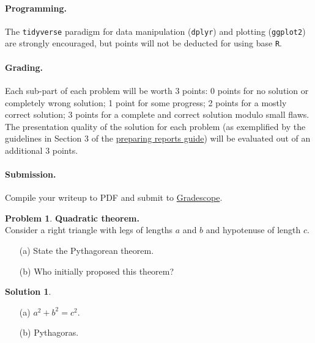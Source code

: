 \documentclass[11pt,letterpaper,english,oneside]{article} %
\theoremstyle{definition} %
\newtheorem{problem}{Problem}
\newtheorem{solution}{Solution}
\newenvironment{prob}{\clearpage \begin{problem}\hspace{0pt}}{\end{problem}}
\newenvironment{sol}{\begin{solution}\hspace{0pt}}{\end{solution}}
\begin{document}
\paragraph{Programming.}

The \texttt{tidyverse} paradigm for data manipulation (\texttt{dplyr}) and plotting (\texttt{ggplot2}) are strongly encouraged, but points will not be deducted for using base \texttt{R}. 

\paragraph{Grading.} Each sub-part of each problem will be worth 3 points: 0 points for no solution or completely wrong solution; 1 point for some progress; 2 points for a mostly correct solution; 3 points for a complete and correct solution modulo small flaws. The presentation quality of the solution for each problem (as exemplified by the guidelines in Section 3 of the \href{https://github.com/Katsevich-Teaching/stat-961-fall-2021/blob/main/getting-started/preparing-reports.pdf}{preparing reports guide}) will be evaluated out of an additional 3 points.

\paragraph{Submission.} Compile your writeup to PDF and submit to \href{https://www.gradescope.com/courses/284562}{Gradescope}.

\clearpage

\begin{prob} \textbf{Quadratic theorem.} \\

\noindent Consider a right triangle with legs of lengths $a$ and $b$ and hypotenuse of length $c$. 
\begin{enumerate}
\item[(a)] State the Pythagorean theorem.
\item[(b)] Who initially proposed this theorem?
\end{enumerate}

\end{prob}

\begin{sol}

\begin{enumerate}
  \item[(a)] $a^2 + b^2 = c^2.$
  \item[(b)] Pythagoras.
\end{enumerate}


\end{sol}
\end{document}
